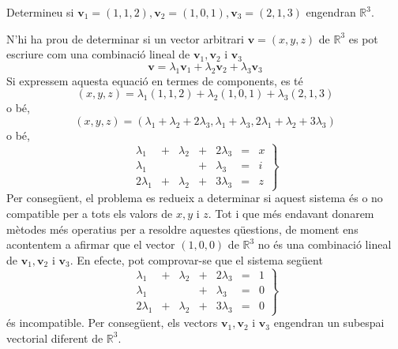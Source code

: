 \begin{exemple}
Determineu si $\mathbf{v}_{1}=(1,1,2),\mathbf{v}_{2}=(1,0,1),\mathbf{v}%
_{3}=(2,1,3)$ engendran $\mathbb{R}^{3}$.

\end{exemple}
\begin{solucio}
N’hi ha prou de determinar si un vector arbitrari $\mathbf{v}=(x,y,z)$ de $%
\mathbb{R}^{3}$ es pot escriure com una combinació lineal de $%
\mathbf{v}_{1},\mathbf{v}_{2}$ i $\mathbf{v}_{3}$%
\begin{equation*}
\mathbf{v}=\lambda _{1}\mathbf{v}_{1}+\lambda _{2}\mathbf{v}_{2}+\lambda _{3}%
\mathbf{v}_{3}
\end{equation*}%
Si expressem aquesta equació en termes de components, es té%
\begin{equation*}
(x,y,z)=\lambda _{1}(1,1,2)+\lambda _{2}(1,0,1)+\lambda _{3}(2,1,3)
\end{equation*}%
o bé,%
\begin{equation*}
(x,y,z)=(\lambda _{1}+\lambda _{2}+2\lambda _{3},\lambda _{1}+\lambda
_{3},2\lambda _{1}+\lambda _{2}+3\lambda _{3})
\end{equation*}%
o bé,%
\begin{equation*}
\left. 
\begin{array}{ccccccc}
\lambda _{1} & + & \lambda _{2} & + & 2\lambda _{3} & = & x \\ 
\lambda _{1} &  &  & + & \lambda _{3} & = & i \\ 
2\lambda _{1} & + & \lambda _{2} & + & 3\lambda _{3} & = & z%
\end{array}%
\right\}
\end{equation*}%
Per consegüent, el problema es redueix a determinar si aquest sistema és o no
compatible per a tots els valors de $x,y$ i $z$. Tot i que més endavant
donarem mètodes més operatius per a resoldre aquestes qüestions, de
moment ens acontentem a afirmar que el vector $(1,0,0)$ de $\mathbb{R}%
^{3}$ no és una combinació lineal de $\mathbf{v}_{1},\mathbf{v}_{2}$ i $%
\mathbf{v}_{3}$. En efecte, pot comprovar-se que el sistema següent%
\begin{equation*}
\left. 
\begin{array}{ccccccc}
\lambda _{1} & + & \lambda _{2} & + & 2\lambda _{3} & = & 1 \\ 
\lambda _{1} &  &  & + & \lambda _{3} & = & 0 \\ 
2\lambda _{1} & + & \lambda _{2} & + & 3\lambda _{3} & = & 0%
\end{array}%
\right\}
\end{equation*}%
és incompatible. Per consegüent, els vectors $\mathbf{v}_{1},\mathbf{v}%
_{2}$ i $\mathbf{v}_{3}$ engendran un subespai vectorial diferent de $%
\mathbb{R}^{3}$.
\end{solucio}


